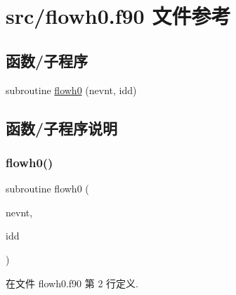 \hypertarget{flowh0_8f90}{}\section{src/flowh0.f90 文件参考}
\label{flowh0_8f90}
\subsection*{函数/子程序}
\begin{DoxyCompactItemize}
\item 
subroutine \mbox{\hyperlink{flowh0_8f90_ab37bb412cc5e8460224dce64af7c4e45}{flowh0}} (nevnt, idd)
\end{DoxyCompactItemize}


\subsection{函数/子程序说明}
\mbox{\label{flowh0_8f90_ab37bb412cc5e8460224dce64af7c4e45}} 
\subsubsection{\texorpdfstring{flowh0()}{flowh0()}}
{\footnotesize\ttfamily subroutine flowh0 (\begin{DoxyParamCaption}\item[{}]{nevnt,  }\item[{}]{idd }\end{DoxyParamCaption})}



在文件 flowh0.\+f90 第 2 行定义.

